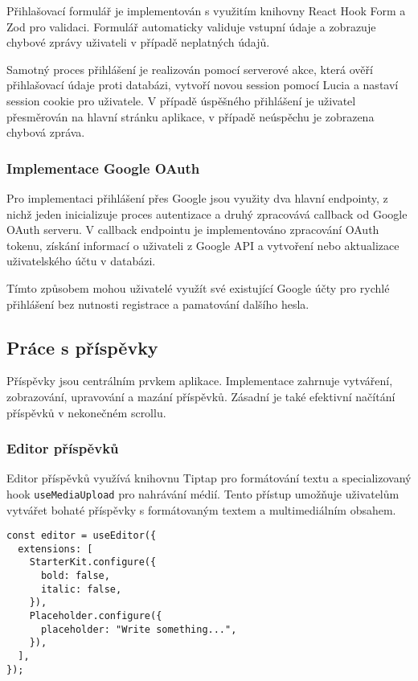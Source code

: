 \documentclass[12pt]{article}
\begin{document}
Přihlašovací formulář je implementován s využitím knihovny React Hook Form \citep{ReactHookForm} a Zod \citep{ZodGitHub} pro validaci. Formulář automaticky validuje vstupní údaje a zobrazuje chybové zprávy uživateli v případě neplatných údajů.

Samotný proces přihlášení je realizován pomocí serverové akce, která ověří přihlašovací údaje proti databázi, vytvoří novou session pomocí Lucia a nastaví session cookie pro uživatele. V případě úspěšného přihlášení je uživatel přesměrován na hlavní stránku aplikace, v případě neúspěchu je zobrazena chybová zpráva.

\subsubsection{Implementace Google OAuth}

Pro implementaci přihlášení přes Google jsou využity dva hlavní endpointy, z nichž jeden inicializuje proces autentizace a druhý zpracovává callback od Google OAuth serveru. V callback endpointu je implementováno zpracování OAuth tokenu, získání informací o uživateli z Google API a vytvoření nebo aktualizace uživatelského účtu v databázi.

Tímto způsobem mohou uživatelé využít své existující Google účty pro rychlé přihlášení bez nutnosti registrace a pamatování dalšího hesla.

\subsection{Práce s příspěvky}

Příspěvky jsou centrálním prvkem aplikace. Implementace zahrnuje vytváření, zobrazování, upravování a mazání příspěvků. Zásadní je také efektivní načítání příspěvků v nekonečném scrollu.

\subsubsection{Editor příspěvků}

Editor příspěvků využívá knihovnu Tiptap \citep{Tiptap2023} pro formátování textu a specializovaný hook \texttt{useMediaUpload} pro nahrávání médií. Tento přístup umožňuje uživatelům vytvářet bohaté příspěvky s formátovaným textem a multimediálním obsahem.

\begin{lstlisting}[style=typescript]
const editor = useEditor({
  extensions: [
    StarterKit.configure({
      bold: false,
      italic: false,
    }),
    Placeholder.configure({
      placeholder: "Write something...",
    }),
  ],
});
\end{lstlisting}
\end{document}
